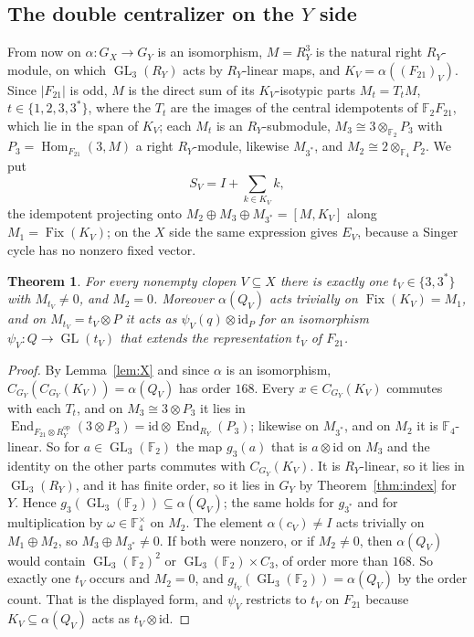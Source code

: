 \documentclass[11pt]{amsart}
\newtheorem{theorem}{Theorem}[section]
\theoremstyle{remark}
\newcommand{\F}{\mathbb F}
\newcommand{\GL}{\operatorname{GL}}
\newcommand{\Fix}{\operatorname{Fix}}
\newcommand{\Hom}{\operatorname{Hom}}
\newcommand{\End}{\operatorname{End}}
\begin{document}
\subsection*{The double centralizer on the $Y$ side}
From now on $\alpha\colon G_X\to G_Y$ is an isomorphism, $M=R_Y^3$ is the
natural right $R_Y$-module, on which $\GL_3(R_Y)$ acts by $R_Y$-linear
maps, and $K_V=\alpha((F_{21})_V)$. Since $|F_{21}|$ is odd, $M$ is the
direct sum of its $K_V$-isotypic parts $M_t=T_tM$, $t\in\{1,2,3,3^*\}$,
where the $T_t$ are the images of the central idempotents of
$\F_2F_{21}$, which lie in the span of $K_V$; each $M_t$ is an
$R_Y$-submodule, $M_3\cong3\otimes_{\F_2}P_3$ with
$P_3=\Hom_{F_{21}}(3,M)$ a right $R_Y$-module, likewise $M_{3^*}$, and
$M_2\cong2\otimes_{\F_4}P_2$. We put
\[
  S_V=I+\sum_{k\in K_V}k,
\]
the idempotent projecting onto $M_2\oplus M_3\oplus M_{3^*}=[M,K_V]$ along
$M_1=\Fix(K_V)$; on the $X$ side the same expression gives $E_V$, because
a Singer cycle has no nonzero fixed vector.

\begin{theorem}\label{thm:C}
For every nonempty clopen $V\subseteq X$ there is exactly one
$t_V\in\{3,3^*\}$ with $M_{t_V}\ne0$, and $M_2=0$. Moreover $\alpha(Q_V)$
acts trivially on $\Fix(K_V)=M_1$, and on $M_{t_V}=t_V\otimes P$ it acts as
$\psi_V(q)\otimes\mathrm{id}_P$ for an isomorphism
$\psi_V\colon Q\to\GL(t_V)$ that extends the representation $t_V$ of
$F_{21}$.
\end{theorem}

\begin{proof}
By Lemma~\ref{lem:X} and since $\alpha$ is an isomorphism,
$C_{G_Y}(C_{G_Y}(K_V))=\alpha(Q_V)$ has order $168$. Every
$x\in C_{G_Y}(K_V)$ commutes with each $T_t$, and on
$M_3\cong3\otimes P_3$ it lies in
$\End_{F_{21}\otimes R_Y^{\mathrm{op}}}(3\otimes P_3)=\mathrm{id}\otimes\End_{R_Y}(P_3)$;
likewise on $M_{3^*}$, and on $M_2$ it is $\F_4$-linear. So for
$a\in\GL_3(\F_2)$ the map $g_3(a)$ that is $a\otimes\mathrm{id}$ on $M_3$
and the identity on the other parts commutes with $C_{G_Y}(K_V)$. It is
$R_Y$-linear, so it lies in $\GL_3(R_Y)$, and it has finite order, so it
lies in $G_Y$ by Theorem~\ref{thm:index} for $Y$. Hence
$g_3(\GL_3(\F_2))\subseteq\alpha(Q_V)$; the same holds for $g_{3^*}$ and
for multiplication by $\omega\in\F_4^\times$ on $M_2$. The element
$\alpha(c_V)\ne I$ acts trivially on $M_1\oplus M_2$, so
$M_3\oplus M_{3^*}\ne0$. If both were nonzero, or if $M_2\ne0$, then
$\alpha(Q_V)$ would contain $\GL_3(\F_2)^2$ or $\GL_3(\F_2)\times C_3$, of
order more than $168$. So exactly one $t_V$ occurs and $M_2=0$, and
$g_{t_V}(\GL_3(\F_2))=\alpha(Q_V)$ by the order count. That is the
displayed form, and $\psi_V$ restricts to $t_V$ on $F_{21}$ because
$K_V\subseteq\alpha(Q_V)$ acts as $t_V\otimes\mathrm{id}$.
\end{proof}
\end{document}
